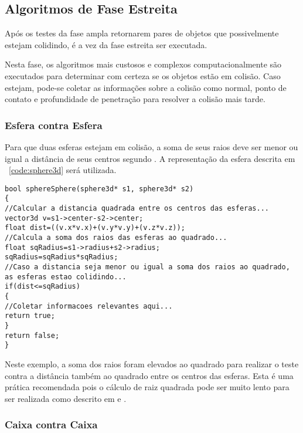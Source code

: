 \subsection{Algoritmos de Fase Estreita}

Após  os testes da fase ampla retornarem pares de objetos que possivelmente
estejam colidindo, é a vez da fase estreita ser executada.

Nesta fase, os algoritmos mais custosos e complexos computacionalmente são
executados para determinar com certeza se os objetos estão em colisão.
Caso estejam, pode-se coletar as informações sobre a colisão como normal, ponto
de contato e profundidade de penetração para resolver a colisão mais tarde.

\subsubsection{Esfera contra Esfera}

Para que duas esferas estejam em colisão, a soma de seus raios deve ser menor
ou igual a distância de seus centros segundo .
A representação da esfera descrita em ~\ref{code:sphere3d} será utilizada.

\begin{lstlisting}[frame=single,caption=Colisão entre esferas\label{code:collisionSphereSphere}]
bool sphereSphere(sphere3d* s1, sphere3d* s2)
{
//Calcular a distancia quadrada entre os centros das esferas...
vector3d v=s1->center-s2->center;
float dist=((v.x*v.x)+(v.y*v.y)+(v.z*v.z));
//Calcula a soma dos raios das esferas ao quadrado...
float sqRadius=s1->radius+s2->radius;
sqRadius=sqRadius*sqRadius;
//Caso a distancia seja menor ou igual a soma dos raios ao quadrado, as esferas estao colidindo...
if(dist<=sqRadius)
{
//Coletar informacoes relevantes aqui...
return true;
}
return false;
}
\end{lstlisting}

Neste exemplo, a soma dos raios foram elevados ao quadrado para realizar o
teste contra a distância também ao quadrado entre os centros das esferas.
Esta é uma prática recomendada pois o cálculo de raiz quadrada pode ser muito
lento para ser realizada como descrito em  e .

\subsubsection{Caixa contra Caixa}

